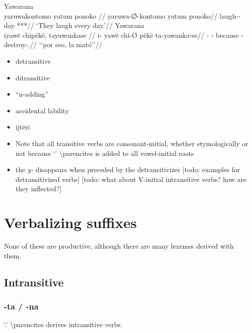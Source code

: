 \documentclass{memoir}
\begin{document}
\pex\label{}    \a Yawarana\\
    \label{convrisamaj-42}        \begingl
        \glpreamble yaruwakontomo yatum ponoko //
        \gla yaruwa-∅-kontomo yatum ponoko//
        \glb laugh-- day ***//
            \glft ‘They laugh every day.’//  
        \endgl 
    \a Yawarana\\
    \label{convfemgrme-217}        \begingl
        \glpreamble iyawë chipëkë, tayawankase //
        \gla i- yawë chi-Ø pëkë ta-yawanka-se//
        \glb {}-  - because -destroy-.//
            \glft ‘‘por eso, la mató’’//  
        \endgl 
\xe

\begin{itemize}
\item
  detransitive
\item
  ditransitive
\item
  ``n-adding''
\item
  accidental lability
\item
  ijtëri
\item
  Note that all transitive verbs are consonant‑initial, whether
  etymologically or not because  `'
  \textbackslash parencites is added to all vowel‑initial roots
\item
  the \emph{y‑} disappears when preceded by the detransitivizer {[}todo:
  examples for detransitivized verbs{]} {[}todo: what about V-initial
  intransitive verbs? how are they inflected?{]}
\end{itemize}

\section{\texorpdfstring{Verbalizing suffixes
\label{sec:vbz}}{Verbalizing suffixes }}

None of these are productive, although there are many lexemes derived
with them.

\subsection{Intransitive}

\subsubsection{\texorpdfstring{-ta / -na \label{sec:tavbz}}{-ta / -na }}

 `.' \textbackslash parencites derives
intransitive verbs.
\end{document}
